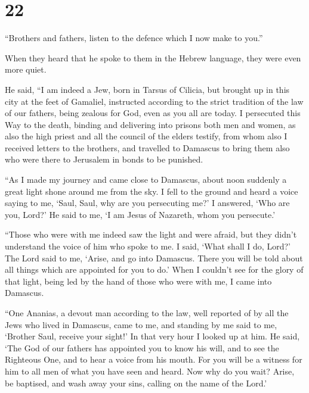 \hypertarget{section-21}{%
\section{22}\label{section-21}}

 ``Brothers and fathers, listen to the defence which I now
make to you.''

 When they heard that he spoke to them in the Hebrew
language, they were even more quiet.

He said,  ``I am indeed a Jew, born in Tarsus of Cilicia,
but brought up in this city at the feet of Gamaliel, instructed
according to the strict tradition of the law of our fathers, being
zealous for God, even as you all are today.  I persecuted
this Way to the death, binding and delivering into prisons both men and
women,  as also the high priest and all the council of the
elders testify, from whom also I received letters to the brothers, and
travelled to Damascus to bring them also who were there to Jerusalem in
bonds to be punished.

 ``As I made my journey and came close to Damascus, about
noon suddenly a great light shone around me from the sky. 
I fell to the ground and heard a voice saying to me, `Saul, Saul, why
are you persecuting me?'  I answered, `Who are you, Lord?'
He said to me, `I am Jesus of Nazareth, whom you persecute.'

 ``Those who were with me indeed saw the light and were
afraid, but they didn't understand the voice of him who spoke to me.
 I said, `What shall I do, Lord?' The Lord said to me,
`Arise, and go into Damascus. There you will be told about all things
which are appointed for you to do.'  When I couldn't see
for the glory of that light, being led by the hand of those who were
with me, I came into Damascus.

 ``One Ananias, a devout man according to the law, well
reported of by all the Jews who lived in Damascus,  came
to me, and standing by me said to me, `Brother Saul, receive your
sight!' In that very hour I looked up at him.  He said,
`The God of our fathers has appointed you to know his will, and to see
the Righteous One, and to hear a voice from his mouth. 
For you will be a witness for him to all men of what you have seen and
heard.  Now why do you wait? Arise, be baptised, and wash
away your sins, calling on the name of the Lord.'

